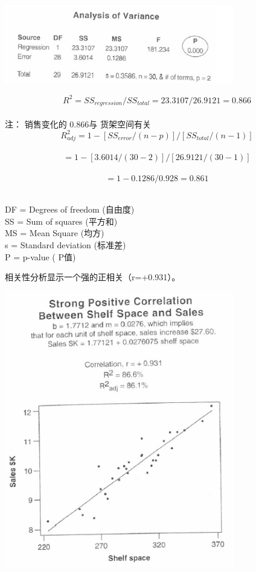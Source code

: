 
\includegraphics[width=10cm]{Ch24rrScreenshot2023-04-02094408.jpg}

\[{R}^2 = {SS}_{regression} / {SS}_{total} = 23.3107 / 26.9121 = 0.866\]\\
注： 销售变化的 0.866与 货架空间有关\\

\[{R}_{adj}^2 = 1 - [{SS}_{error} / (n - p)] / [{SS}_{total} / (n - 1)]\]\\
\[= 1 - [3.6014 / (30 - 2)] / [26.9121 / (30 - 1)]\]\\
\[= 1 - 0.1286 / 0.928 = 0.861\]\\

\begin{description}
\tightlist
\item[]
DF = Degrees of freedom (自由度)\\
SS = Sum of squares (平方和)\\
MS = Mean Square (均方)\\
s = Standard deviation (标准差)\\
P = p-value ( P值)\\
\end{description}

相关性分析显示一个强的正相关（r=+0.931）。


\includegraphics[width=10cm]{相关性13.png}

